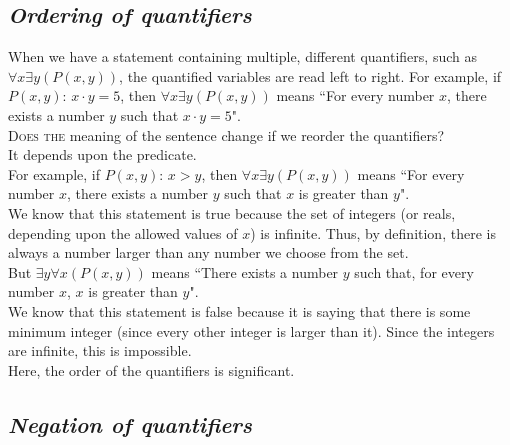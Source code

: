 \documentclass{article}
\begin{document}
\subsection{\em Ordering of quantifiers}

When we have a statement containing multiple, different quantifiers, such as $\forall x\exists y(P(x,y))$, the quantified variables are read left to right. For example, if $P(x,y):\,x\cdot y=5$, then $\forall x\exists y(P(x,y))$ means ``For every number $x$, there exists a number $y$ such that $x\cdot y=5$".\\[1ex]
\textsc{Does the} meaning of the sentence change if we reorder the quantifiers?\\
It depends upon the predicate.\\[1ex]
For example, if $P(x,y):\,x>y$, then $\forall x\exists y(P(x,y))$ means ``For every number $x$, there exists a number $y$ such that $x$ is greater than $y$".\\
We know that this statement is true because the set of integers (or reals, depending upon the allowed values of $x$) is infinite. Thus, by definition, there is always a number larger than any number we choose from the set.\\[1ex]
But $\exists y\forall x(P(x,y))$ means ``There exists a number $y$ such that, for every number $x$, $x$ is greater than $y$".\\
We know that this statement is false because it is saying that there is some minimum integer (since every other integer is larger than it). Since the integers are infinite, this is impossible.\\[1ex]
Here, the order of the quantifiers is significant.

\subsection{\em Negation of quantifiers}
\end{document}
